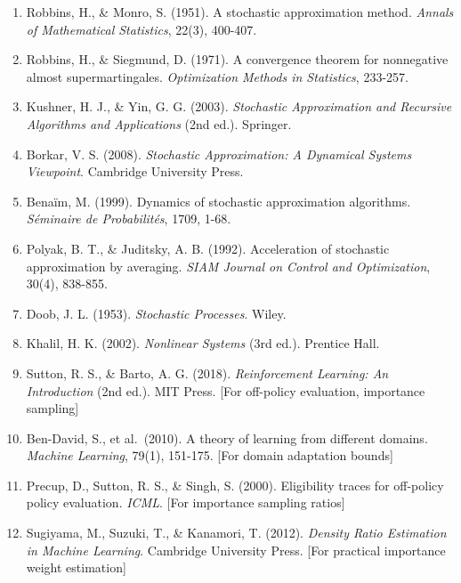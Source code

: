 \documentclass[
  12pt,
]{article}
\providecommand{\tightlist}{%
  \setlength{\itemsep}{0pt}\setlength{\parskip}{0pt}}
\begin{document}
\begin{enumerate}
\def\labelenumi{\arabic{enumi}.}
\tightlist
\item
  Robbins, H., \& Monro, S. (1951). A stochastic approximation method.
  \emph{Annals of Mathematical Statistics}, 22(3), 400-407.
\item
  Robbins, H., \& Siegmund, D. (1971). A convergence theorem for
  nonnegative almost supermartingales. \emph{Optimization Methods in
  Statistics}, 233-257.
\item
  Kushner, H. J., \& Yin, G. G. (2003). \emph{Stochastic Approximation
  and Recursive Algorithms and Applications} (2nd ed.). Springer.
\item
  Borkar, V. S. (2008). \emph{Stochastic Approximation: A Dynamical
  Systems Viewpoint}. Cambridge University Press.
\item
  Benaïm, M. (1999). Dynamics of stochastic approximation algorithms.
  \emph{Séminaire de Probabilités}, 1709, 1-68.
\item
  Polyak, B. T., \& Juditsky, A. B. (1992). Acceleration of stochastic
  approximation by averaging. \emph{SIAM Journal on Control and
  Optimization}, 30(4), 838-855.
\item
  Doob, J. L. (1953). \emph{Stochastic Processes}. Wiley.
\item
  Khalil, H. K. (2002). \emph{Nonlinear Systems} (3rd ed.). Prentice
  Hall.
\item
  Sutton, R. S., \& Barto, A. G. (2018). \emph{Reinforcement Learning:
  An Introduction} (2nd ed.). MIT Press. {[}For off-policy evaluation,
  importance sampling{]}
\item
  Ben-David, S., et al.~(2010). A theory of learning from different
  domains. \emph{Machine Learning}, 79(1), 151-175. {[}For domain
  adaptation bounds{]}
\item
  Precup, D., Sutton, R. S., \& Singh, S. (2000). Eligibility traces for
  off-policy policy evaluation. \emph{ICML}. {[}For importance sampling
  ratios{]}
\item
  Sugiyama, M., Suzuki, T., \& Kanamori, T. (2012). \emph{Density Ratio
  Estimation in Machine Learning}. Cambridge University Press. {[}For
  practical importance weight estimation{]}
\end{enumerate}
\end{document}
